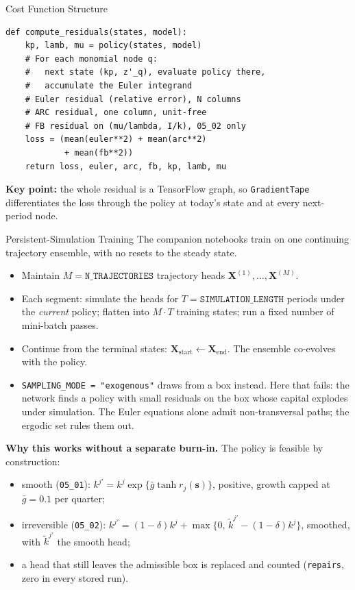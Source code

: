 \documentclass[aspectratio=169,11pt]{beamer}
\newcommand{\emphc}[1]{\textcolor{harvardcrimson}{#1}}
\begin{document}
\begin{frame}[fragile]{Cost Function Structure}
\begin{lstlisting}[basicstyle=\footnotesize\ttfamily]
def compute_residuals(states, model):
    kp, lamb, mu = policy(states, model)
    # For each monomial node q:
    #   next state (kp, z'_q), evaluate policy there,
    #   accumulate the Euler integrand
    # Euler residual (relative error), N columns
    # ARC residual, one column, unit-free
    # FB residual on (mu/lambda, I/k), 05_02 only
    loss = (mean(euler**2) + mean(arc**2)
            + mean(fb**2))
    return loss, euler, arc, fb, kp, lamb, mu
\end{lstlisting}

\vspace{0.3em}
\textbf{Key point:} the whole residual is a TensorFlow graph, so \texttt{GradientTape} differentiates the loss through the policy at today's state and at every next-period node.
\end{frame}

\begin{frame}{Persistent-Simulation Training}
\footnotesize
The companion notebooks train on \emphc{one continuing trajectory ensemble}, with no resets to the steady state.

\begin{itemize}\itemsep1pt
    \item Maintain $M = \texttt{N\_TRAJECTORIES}$ trajectory heads $\bm{X}^{(1)}, \ldots, \bm{X}^{(M)}$.
    \item Each \emphc{segment}: simulate the heads for $T = \texttt{SIMULATION\_LENGTH}$ periods under the \emph{current} policy; flatten into $M\!\cdot\!T$ training states; run a fixed number of mini-batch passes.
    \item Continue from the terminal states: $\bm{X}_{\mathrm{start}} \leftarrow \bm{X}_{\mathrm{end}}$. The ensemble \emphc{co-evolves} with the policy.
    \item \texttt{SAMPLING\_MODE = "exogenous"} draws from a box instead. Here that fails: the network finds a policy with small residuals on the box whose capital explodes under simulation. The Euler equations alone admit non-transversal paths; the ergodic set rules them out.
\end{itemize}

\textbf{Why this works without a separate burn-in.} The policy is feasible by construction:
\begin{itemize}\itemsep1pt
    \item smooth (\texttt{05\_01}): $k^{j\prime} = k^j \exp\{\bar g \tanh r_j(\bm{s})\}$, positive, growth capped at $\bar g = 0.1$ per quarter;
    \item irreversible (\texttt{05\_02}): $k^{j\prime} = (1-\delta)k^j + \max\{0,\, \tilde k^{j\prime} - (1-\delta)k^j\}$, smoothed, with $\tilde k^{j\prime}$ the smooth head;
    \item a head that still leaves the admissible box is replaced and counted (\texttt{repairs}, zero in every stored run).
\end{itemize}
\end{frame}
\end{document}
